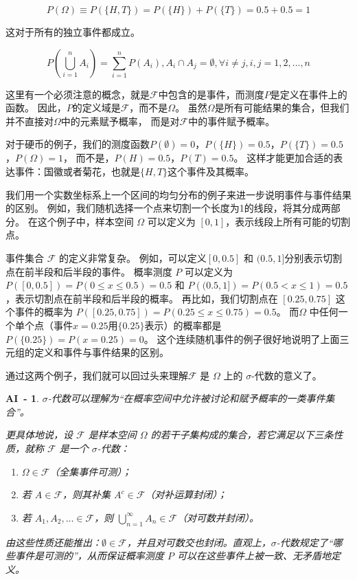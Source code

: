 \documentclass[a4paper]{ctexart}
\newtheorem{AI}{AI~-}
\begin{document}
\begin{equation}
    P(\Omega) \equiv P(\{H, T\}) = P(\{H\}) + P(\{T\}) = 0.5 + 0.5 = 1
\end{equation}

这对于所有的独立事件都成立。

\begin{equation}
    P\left(\bigcup_{i=1}^{n} A_i\right) = \sum_{i=1}^{n} P(A_i),
    A_i \cap A_j = \emptyset, \forall i \neq j, i, j = 1, 2, \ldots, n
\end{equation}

这里有一个必须注意的概念，就是$\mathcal{F}$中包含的是事件，而测度$P$是定义在事件上的函数。
因此，$P$的定义域是$\mathcal{F}$，而不是$\Omega$。
虽然$\Omega$是所有可能结果的集合，但我们并不直接对$\Omega$中的元素赋予概率，
而是对$\mathcal{F}$中的事件赋予概率。

对于硬币的例子，我们的测度函数$P(\emptyset) = 0$，$P(\{H\}) = 0.5$，$P(\{T\}) = 0.5$，$P(\Omega) = 1$，
而不是，$P(H) = 0.5$，$P(T) = 0.5$。
这样才能更加合适的表达事件：国徽或者菊花，也就是$\{H, T\}$这个事件及其概率。

我们用一个实数坐标系上一个区间的均匀分布的例子来进一步说明事件与事件结果的区别。
例如，我们随机选择一个点来切割一个长度为1的线段，将其分成两部分。
在这个例子中，样本空间 $\Omega$ 可以定义为 $[0, 1]$，表示线段上所有可能的切割点。

事件集合 $\mathcal{F}$ 的定义非常复杂。
例如，可以定义$[0, 0.5]$ 和 $(0.5, 1]$分别表示切割点在前半段和后半段的事件。
概率测度 $P$ 可以定义为 $P\left([0, 0.5]\right) = P(0 \le x \le 0.5) = 0.5$
和 $P\left((0.5,1]\right) = P(0.5 < x \le 1) = 0.5$，表示切割点在前半段和后半段的概率。
再比如，我们切割点在 $[0.25, 0.75]$ 这个事件的概率为 $P\left([0.25, 0.75]\right) = P(0.25 \le x \le 0.75) = 0.5$。
而$\Omega$ 中任何一个单个点（事件$x=0.25$用$\{0.25\}$表示）的概率都是 $P\left(\{0.25\}\right) = P(x = 0.25) = 0$。
这个连续随机事件的例子很好地说明了上面三元组的定义和事件与事件结果的区别。

通过这两个例子，我们就可以回过头来理解$\mathcal{F}$ 是 $\Omega$ 上的 $\sigma$-代数的意义了。

\begin{AI}
    $\sigma$-代数可以理解为“在概率空间中允许被讨论和赋予概率的一类事件集合”。

    更具体地说，设 $\mathcal{F}$ 是样本空间 $\Omega$ 的若干子集构成的集合，若它满足以下三条性质，就称 $\mathcal{F}$ 是一个 $\sigma$-代数：
    \begin{enumerate}
        \item $\Omega \in \mathcal{F}$（全集事件可测）；
        \item 若 $A \in \mathcal{F}$，则其补集 $A^c \in \mathcal{F}$（对补运算封闭）；
        \item 若 $A_1, A_2, \dots \in \mathcal{F}$，则 $\bigcup_{n=1}^{\infty} A_n \in \mathcal{F}$（对可数并封闭）。
    \end{enumerate}

    由这些性质还能推出：$\emptyset \in \mathcal{F}$，并且对可数交也封闭。直观上，$\sigma$-代数规定了“哪些事件是可测的”，从而保证概率测度 $P$ 可以在这些事件上被一致、无矛盾地定义。
\end{AI}
\end{document}
